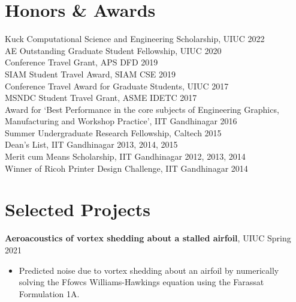 \documentclass[margin]{res}
\begin{document}
\begin{resume}
\section{\large Honors \& Awards}
Kuck Computational Science and Engineering Scholarship, UIUC \hfill 2022\vspace{0.1cm}\\
AE Outstanding Graduate Student Fellowship, UIUC \hfill 2020\vspace{0.1cm}\\
Conference Travel Grant, APS DFD \hfill 2019\vspace{0.1cm}\\
SIAM Student Travel Award, SIAM CSE \hfill 2019\vspace{0.1cm}\\
Conference Travel Award for Graduate Students, UIUC \hfill 2017\vspace{0.1cm}\\
MSNDC Student Travel Grant, ASME IDETC \hfill 2017\vspace{0.1cm}\\
Award for `Best Performance in the core subjects of Engineering Graphics, Manufacturing and Workshop Practice', IIT Gandhinagar \hfill 2016\vspace{0.1cm}\\
Summer Undergraduate Research Fellowship, Caltech \hfill 2015\vspace{0.1cm}\\
Dean's List, IIT Gandhinagar \hfill 2013, 2014, 2015\vspace{0.1cm}\\
Merit cum Means Scholarship, IIT Gandhinagar \hfill 2012, 2013, 2014\vspace{0.1cm}\\
Winner of Ricoh Printer Design Challenge, IIT Gandhinagar \hfill 2014


\section{\large Selected Projects}

{\bf Aeroacoustics of vortex shedding about a stalled airfoil}, UIUC \hfill Spring 2021
\begin{itemize}
\item Predicted noise due to vortex shedding about an airfoil by numerically solving the Ffowcs Williams-Hawkings equation using the Farassat Formulation 1A.
\end{itemize}


\end{resume}
\end{document}
